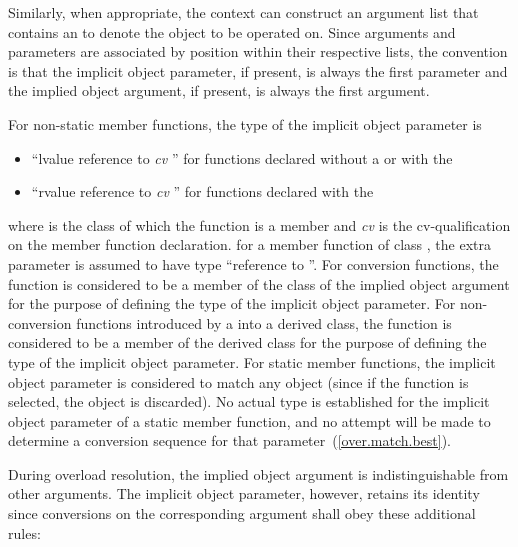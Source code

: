 \pnum
Similarly, when appropriate, the context can construct an
argument list that contains an
to denote
the object to be operated on.
Since arguments and parameters are
associated by position within their respective lists, the
convention is that the implicit object parameter, if present, is
always the first parameter and the implied object argument, if
present, is always the first argument.

\pnum
For non-static member functions, the type of the implicit object
parameter is

\begin{itemize}
\item ``lvalue reference to \textit{cv} '' for functions declared
without a  or with the
\tcode{\&} 
\item ``rvalue reference to \textit{cv} '' for functions declared with the
\tcode{\&\&} 
\end{itemize}

where
is the class of which the function is a member and
\textit{cv}
is the cv-qualification on the
member function declaration.
\enterexample
for a
member
function of class
,
the extra parameter is assumed to have type
``reference to
''.
\exitexample
For conversion functions, the function is considered to be a member of the
class of the implied object argument for the purpose of defining the
type of the implicit object parameter.
For non-conversion functions
introduced by a
into a derived class, the function is
considered to be a member of the derived class for the purpose of defining
the type of the implicit object parameter.
For static member functions, the implicit object parameter is considered
to match any object (since if the function is selected, the object is
discarded).
\enternote
No actual type is established for the implicit object parameter
of a static member function, and no attempt will be made to determine a
conversion sequence for that parameter~(\ref{over.match.best}).
\exitnote

\pnum
{}%
During overload resolution, the implied object argument is
indistinguishable from other arguments.
The implicit object
parameter, however, retains its identity since conversions on the
corresponding argument shall obey these additional rules:

